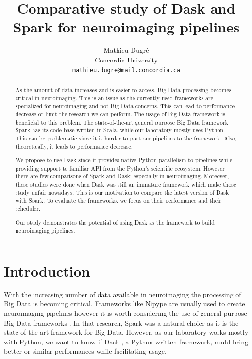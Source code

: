 \documentclass[11pt,a4paper]{article}
\title{Comparative study of Dask and Spark for neuroimaging pipelines}
\author{Mathieu Dugr{\'e} \\
  Concordia University \\
  \texttt{mathieu.dugre@mail.concordia.ca}\\}
\date{}
\begin{document}
\maketitle
\begin{abstract}

As the amount of data increases and is easier to access, Big Data processing becomes
critical in neuroimaging.
This is an issue as the currently used frameworks are specialized for neuroimaging
and not Big Data concerns. This can lead to performance decrease or limit the
research we can perform.
The usage of Big Data framework is beneficial to this problem. The state-of-the-art
general purpose Big Data framework Spark has its code base written in Scala, while
our laboratory mostly uses Python. This can be problematic since it is harder to port
our pipelines to the framework. Also, theoretically, it leads to performance
decrease.

We propose to use Dask since it provides native Python parallelism to pipelines while
providing support to familiar API from the Python's scientific ecosystem. However
there are few comparisons of Spark and Dask; especially in neuroimaging. Moreover,
these studies were done when Dask was still an immature framework which make those
study unfair nowadays. This is our motivation to compare the latest version of Dask
with Spark.
To evaluate the frameworks, we focus on their performance and their scheduler.

Our study demonstrates the potential of using Dask as the framework to build
neuroimaging pipelines.

\end{abstract}

\section{Introduction}
With the increasing number of data available in neuroimaging \citep{ALFAROALMAGRO:18,
UKBioBank:18} the processing of Big Data is becoming critical. Frameworks like Nipype
\citep{Nipype:11} are usually used to create neuroimaging pipelines however it is
worth considering the use of general purpose Big Data frameworks
\citep{Hayot-Sasson:17}. In that research, Spark \citep{Spark:16} was a natural
choice as it is the state-of-the-art framework for Big Data. However, as our
laboratory works mostly with Python, we want to know if Dask \citep{Dask:15}, a
Python written framework, could bring better or similar performances while
facilitating usage.
\end{document}
